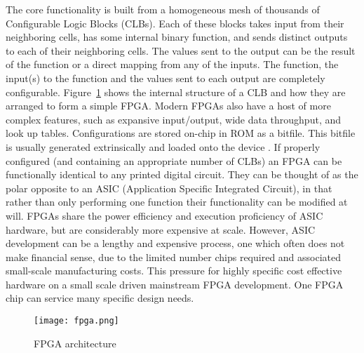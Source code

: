 The core functionality is built from a homogeneous mesh of
thousands of Configurable Logic Blocks (CLBs).
Each of these blocks takes input from their
neighboring cells, has some internal binary function, and sends distinct outputs
to each of their neighboring cells. The values sent to the output can be the
result of the function or a direct mapping from any of the inputs. The function, the input(s) to the function
and the values sent to each output are completely configurable. Figure~\ref{fig:fpga}
shows the internal structure of a CLB and how they are arranged to form a simple FPGA.
Modern FPGAs also have a host of more complex features, such as expansive input/output,
wide data throughput, and look up tables.
Configurations are stored on-chip in ROM as a bitfile. This bitfile is usually generated
extrinsically \cite{10.1007/978-3-540-46239-2_5} and loaded onto the device \cite{Kuon:2008:FAS:1454695.1454696}.
If properly configured (and containing an appropriate number of CLBs) an FPGA can
be functionally identical to any printed digital circuit. They can be thought of
as the polar opposite to an ASIC (Application Specific Integrated Circuit), in that
rather than only performing one function their functionality can be modified at will.
FPGAs share the power efficiency and execution proficiency of ASIC hardware, but
are considerably more expensive at scale. However, ASIC development can
be a lengthy and expensive process, one which often does not make financial sense,
due to the limited number chips required and associated small-scale manufacturing
costs. This pressure for highly specific cost effective hardware on a small scale
driven mainstream FPGA development. One FPGA chip can service many specific
design needs.

\begin{figure}
\centering
\texttt{[image: fpga.png]}
\caption{FPGA architecture}
\label{fig:fpga}
\end{figure}

